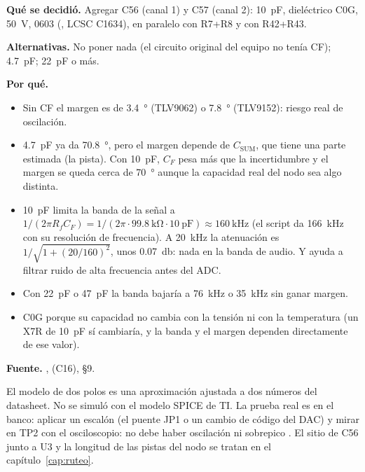 \begin{decision}[CF = \SI{10}{\pico\farad} C0G (cambio C16)]
\textbf{Qué se decidió.} Agregar C56 (canal 1) y C57 (canal 2): \SI{10}{\pico\farad}, dieléctrico C0G, \SI{50}{\volt},
0603 (, LCSC C1634), en paralelo con R7+R8 y con R42+R43.

\textbf{Alternativas.} No poner nada (el circuito original del equipo no tenía CF); \SI{4.7}{\pico\farad};
\SI{22}{\pico\farad} o más.

\textbf{Por qué.}
\begin{itemize}
  \item Sin CF el margen es de \SI{3.4}{\degree} (TLV9062) o \SI{7.8}{\degree} (TLV9152): riesgo real de oscilación.
  \item \SI{4.7}{\pico\farad} ya da \SI{70.8}{\degree}, pero el margen depende de $C_{\mathrm{SUM}}$, que tiene una
        parte estimada (la pista). Con \SI{10}{\pico\farad}, $C_F$ pesa más que la incertidumbre y el margen se queda
        cerca de \SI{70}{\degree} aunque la capacidad real del nodo sea algo distinta.
  \item \SI{10}{\pico\farad} limita la banda de la señal a $1/(2\pi R_f C_F) = 1/(2\pi\cdot\SI{99.8}{\kilo\ohm}\cdot
        \SI{10}{\pico\farad}) \approx \SI{160}{\kilo\hertz}$ (el script da \SI{166}{\kilo\hertz} con su resolución de
        frecuencia). A \SI{20}{\kilo\hertz} la atenuación es $1/\sqrt{1+(20/160)^2}$, unos \SI{0.07}{\decibel}:
        nada en la banda de audio. Y ayuda a filtrar ruido de alta frecuencia antes del ADC.
  \item Con \SI{22}{\pico\farad} o \SI{47}{\pico\farad} la banda bajaría a \SI{76}{\kilo\hertz} o \SI{35}{\kilo\hertz}
        sin ganar margen.
  \item C0G porque su capacidad no cambia con la tensión ni con la temperatura (un X7R de \SI{10}{\pico\farad} sí
        cambiaría, y la banda y el margen dependen directamente de ese valor).
\end{itemize}

\textbf{Fuente.} ,  (C16),  §9.
\end{decision}

\begin{ojo}
El modelo de dos polos es una aproximación ajustada a dos números del datasheet. No se simuló con el modelo SPICE de
TI. La prueba real es en el banco: aplicar un escalón (el puente JP1 o un cambio de código del DAC) y mirar
 en TP2 con el osciloscopio: no debe haber oscilación ni sobrepico \medir. El sitio de C56 junto a U3 y
la longitud de las pistas del nodo  se tratan en el capítulo~\ref{cap:ruteo}.
\end{ojo}


